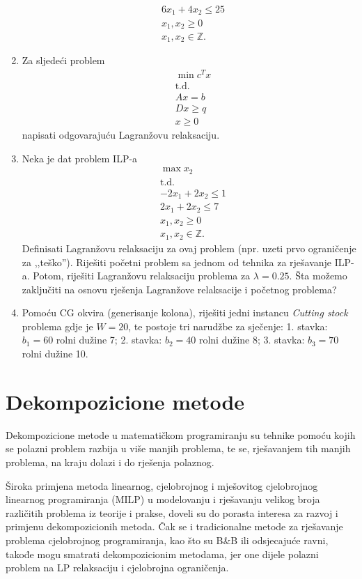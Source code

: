 \documentclass[b5paper, utf8, 11pt, colorlinks]{book}
\theoremstyle{definition}
\begin{document}
\begin{enumerate}
\begin{align*}
  	 & 6 x_1 + 4 x_2 \leq 25 \\
  	 & x_1, x_2 \geq 0 \\
  	 & x_1, x_2\in \mathbb{Z}.
  \end{align*}
\item  Za sljedeći problem 
\begin{align*}
	&\min c^T x \\
	&\mbox{t.d.}\\
	& Ax = b \\
	& D x \geq q \\
	& x \geq 0
\end{align*}
napisati odgovarajuću Lagranžovu relaksaciju. 
\item %
Neka je dat problem ILP-a
\begin{align*}
	&\max x_2 \\
    &\mbox{t.d.}\\
	& -2x_1 + 2x_2 \leq 1 \\
	& 2 x_1 + 2 x_2 \leq 7 \\
	& x_1, x_2 \geq 0 \\
	& x_1, x_2 \in \mathbb{Z}.
\end{align*}
Definisati Lagranžovu relaksaciju za ovaj problem (npr. uzeti prvo ograničenje za ,,teško''). Riješiti početni problem sa jednom od tehnika za rješavanje ILP-a. Potom, riješiti Lagranžovu relaksaciju problema za $\lambda=0.25$. Šta možemo zaključiti na osnovu rješenja Lagranžove relaksacije i početnog problema? 
\item   Pomoću CG okvira (generisanje kolona), riješiti jedni instancu \emph{Cutting stock} problema gdje je  
$W = 20$, te postoje tri narudžbe za sječenje: 1. stavka: $b_1=60$ rolni dužine 7; 2. stavka: $b_2=40$ rolni dužine 8; 3. stavka: $b_3=70$ rolni dužine 10. 

 \end{enumerate}
 
 
 \chapter{Dekompozicione metode}
 
Dekompozicione metode u matematičkom programiranju su tehnike pomoću kojih se polazni problem  razbija u više manjih problema, te se, rješavanjem tih manjih problema, na kraju dolazi i do rješenja polaznog.

Široka primjena metoda linearnog, cjelobrojnog i mješovitog cjelobrojnog linearnog programiranja (MILP) u modelovanju i rješavanju velikog broja različitih problema iz teorije i prakse, doveli su do porasta interesa  za razvoj i primjenu  dekompozicionih metoda. Čak se i tradicionalne metode za rješavanje problema cjelobrojnog programiranja, kao što su B\&B  ili odsjecajuće ravni, takođe   mogu smatrati dekompozicionim metodama, jer one dijele polazni problem na LP relaksaciju i cjelobrojna ograničenja.
\end{document}
